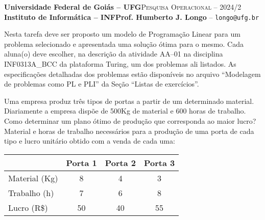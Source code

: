 \documentclass[12pt]{article}
\begin{document}
 \begin{tcolorbox}[rounded corners, colback=blue!3, colframe=blue!40!black]
  \footnotesize\textbf{Universidade Federal de Goiás -- UFG}\hfill \textsc{Pesquisa Operacional -- 2024/2}\\
  \footnotesize\textbf{Instituto de Informática -- INF\hfill Prof. Humberto J. Longo} -- \scriptsize\texttt{longo@ufg.br}
 \end{tcolorbox}\bigskip
%
\begin{tcolorbox}[rounded corners, colback=blue!3, colframe=blue!40!black, title=\textbf{Atividade AA-01 : \discente\ (\matricula)}]
 Nesta tarefa deve ser proposto um modelo de Programação Linear para um problema selecionado e apresentada uma solução ótima para o mesmo. Cada aluna(o) deve escolher, na descrição da atividade AA--01 na disciplina INF0313A\_BCC da plataforma Turing, um dos problemas ali listados. As especificações detalhadas dos problemas estão disponíveis no arquivo ``Modelagem de problemas como PL e PLI'' da Seção ``Listas de exercícios''.
\end{tcolorbox}\bigskip

%
\begin{tcolorbox}[rounded corners, colback=yellow!5, colframe=red!40!black, title=\textbf{Descrição do problema P-\myprob}]
 Uma empresa produz três tipos de portas a partir de um determinado material. Diariamente a empresa dispõe de 500Kg de material e 600 horas de trabalho. Como determinar um plano ótimo de produção que corresponda ao maior lucro? Material e horas de trabalho necessários para a produção de uma porta de cada tipo e lucro unitário obtido com a venda de cada uma:
  \begin{center}\small
   \begin{tabular}{lccc}
    \cmidrule{2-4}
                  & Porta 1 & Porta 2 & Porta 3 \\
    \midrule
    Material (Kg) & 8       & 4       & 3 \\
    Trabalho (h)  & 7       & 6       & 8 \\
    Lucro (R\$)   & 50      & 40      & 55 \\
    \bottomrule
   \end{tabular}
  \end{center}
\end{tcolorbox}\bigskip
\end{document}
